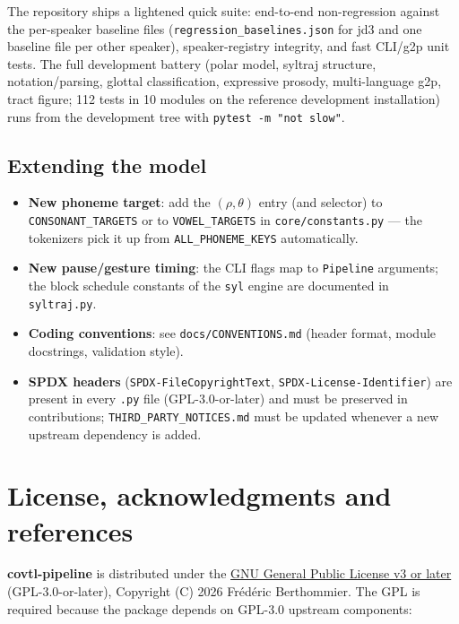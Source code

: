 \documentclass[11pt,a4paper]{article}
\begin{document}
The repository ships a lightened quick suite: end-to-end
non-regression against the per-speaker baseline files
(\texttt{regression\_baselines.json} for jd3 and one baseline file
per other speaker), speaker-registry integrity, and fast CLI/g2p unit tests. The full
development battery (polar model, syltraj structure, notation/parsing,
glottal classification, expressive prosody, multi-language g2p, tract
figure; 112 tests in 10 modules on the reference development
installation) runs from the development tree with
\texttt{pytest -m "not slow"}.

\subsection{Extending the model}

\begin{itemize}[leftmargin=1.5em]
\item \textbf{New phoneme target}: add the \((\rho, \theta)\) entry (and
      selector) to \texttt{CONSONANT\_TARGETS} or to
      \texttt{VOWEL\_TARGETS} in \texttt{core/constants.py} --- the
      tokenizers pick it up from \texttt{ALL\_PHONEME\_KEYS} automatically.
\item \textbf{New pause/gesture timing}: the CLI flags map to
      \texttt{Pipeline} arguments; the block schedule constants of the
      \texttt{syl} engine are documented in \texttt{syltraj.py}.
\item \textbf{Coding conventions}: see \texttt{docs/CONVENTIONS.md}
      (header format, module docstrings, validation style).
\item \textbf{SPDX headers} (\texttt{SPDX-FileCopyrightText},
      \texttt{SPDX-License-Identifier}) are present in every
      \texttt{.py} file (GPL-3.0-or-later) and must be preserved in
      contributions; \texttt{THIRD\_PARTY\_NOTICES.md} must be updated
      whenever a new upstream dependency is added.
\end{itemize}

\section{License, acknowledgments and references}\label{sec:license}

\textbf{covtl-pipeline} is distributed under the
\href{https://www.gnu.org/licenses/gpl-3.0.html}{GNU General Public
License v3 or later} (GPL-3.0-or-later), Copyright (C) 2026 Frédéric
Berthommier. The GPL is required because the package depends on GPL-3.0
upstream components:
\end{document}
